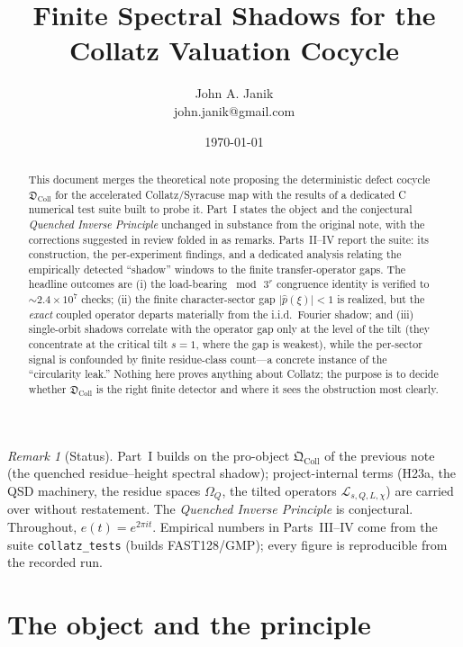 \documentclass[11pt]{article}
\title{Finite Spectral Shadows for the Collatz Valuation Cocycle}
\author{John A. Janik\\
john.janik@gmail.com}
\date{\today}
\newcommand{\Lcal}{\mathcal{L}}
\newcommand{\Om}{\Omega}
\newcommand{\Qcoll}{\mathfrak{Q}_{\mathrm{Coll}}}
\newcommand{\Dcoll}{\mathfrak{D}_{\mathrm{Coll}}}
\theoremstyle{plain}
\theoremstyle{remark}
\newtheorem*{remark}{Remark}
\begin{document}
\maketitle

\begin{abstract}
This document merges the theoretical note proposing the deterministic defect
cocycle $\Dcoll$ for the accelerated Collatz/Syracuse map with the results of a
dedicated C numerical test suite built to probe it. Part~I states the object and
the conjectural \emph{Quenched Inverse Principle} unchanged in substance from the
original note, with the corrections suggested in review folded in as remarks.
Parts~II--IV report the suite: its construction, the per-experiment findings, and
a dedicated analysis relating the empirically detected ``shadow'' windows to the
finite transfer-operator gaps. The headline outcomes are (i) the load-bearing
$\bmod\,3^r$ congruence identity is verified to $\sim\!2.4\times10^{7}$ checks;
(ii) the finite character-sector gap $\lvert\hat p(\xi)\rvert<1$ is realized, but
the \emph{exact} coupled operator departs materially from the i.i.d.\ Fourier
shadow; and (iii) single-orbit shadows correlate with the operator gap only at
the level of the tilt (they concentrate at the critical tilt $s=1$, where the gap
is weakest), while the per-sector signal is confounded by finite residue-class
count---a concrete instance of the ``circularity leak.'' Nothing here proves
anything about Collatz; the purpose is to decide whether $\Dcoll$ is the right
finite detector and where it sees the obstruction most clearly.
\end{abstract}

\begin{remark}[Status]
Part~I builds on the pro-object $\Qcoll$ of the previous note (the quenched
residue--height spectral shadow); project-internal terms (\textsf{H23a}, the QSD
machinery, the residue spaces $\Om_Q$, the tilted operators
$\Lcal_{s,Q,L,\chi}$) are carried over without restatement. The
\emph{Quenched Inverse Principle} is conjectural. Throughout, $e(t)=e^{2\pi i t}$.
Empirical numbers in Parts~III--IV come from the suite \texttt{collatz\_tests}
(builds \textsf{FAST128}/\textsf{GMP}); every figure is reproducible from the
recorded run.
\end{remark}

\tableofcontents

\part{The object and the principle}
\end{document}
